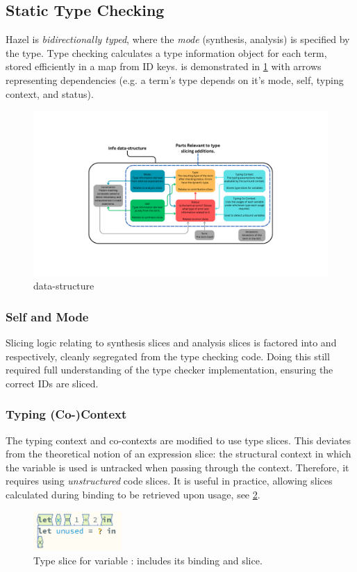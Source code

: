 \subsection{Static Type Checking}\label{sec:TypeChecking}
Hazel is \textit{bidirectionally typed}, where the \textit{mode} (synthesis, analysis) is specified by the  type. Type checking calculates a type information object  for each term, stored efficiently in a map from ID keys.  is demonstrated in \cref{fig:Info} with arrows representing dependencies (e.g. a term's type depends on it's mode, self, typing context, and status).
\begin{figure}[h]
\includegraphics[width=1\textwidth, trim={8cm 5cm 8cm 5cm}, clip]{Media/Figures/info}
\caption{ data-structure}
\label{fig:Info}
\end{figure}

\subsubsection{Self and Mode}
Slicing logic relating to synthesis slices and analysis slices is factored into  and  respectively, cleanly segregated from the type checking code. Doing this still required full understanding of the type checker implementation, ensuring the correct IDs are sliced.

\subsubsection{Typing (Co-)Context}
The typing context and co-contexts are modified to use type slices. This deviates from the theoretical notion of an expression slice: the structural context in which the variable is used is untracked when passing through the context. Therefore, it requires using \textit{unstructured} code slices. It is useful in practice, allowing slices calculated during binding to be retrieved upon usage, see \cref{fig:VarSlice}.
\begin{figure}[h]
\centering
\includegraphics[width=0.3\textwidth]{Media/Figures/var_slice}
\caption{Type slice for variable : includes its binding and slice.}
\label{fig:VarSlice}
\end{figure}

